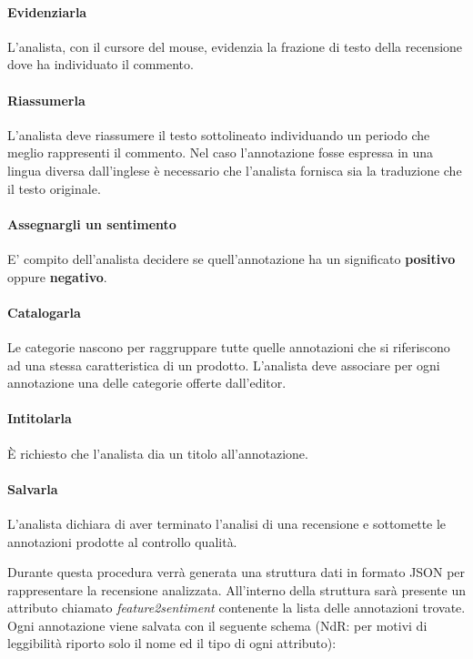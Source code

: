 \paragraph{Evidenziarla}
\label{evidenziarla}
L'analista, con il cursore del mouse, evidenzia la frazione di testo della
recensione dove ha individuato il commento.

\paragraph{Riassumerla}
\label{riassumerla}
L'analista deve riassumere il testo sottolineato individuando un periodo che
meglio rappresenti il commento. Nel caso l'annotazione fosse espressa in una
lingua diversa dall'inglese è necessario che l'analista fornisca sia la
traduzione che il testo originale.

\paragraph{Assegnargli un sentimento}
\label{sentimento}
E' compito dell'analista decidere se quell'annotazione ha un significato
\textbf{positivo} oppure \textbf{negativo}.

\paragraph{Catalogarla}
\label{catalogarla}
Le categorie nascono per raggruppare tutte quelle annotazioni che si
riferiscono ad una stessa caratteristica di un prodotto. L'analista deve
associare per ogni annotazione una delle categorie offerte dall'editor.

\paragraph{Intitolarla}
\label{intitolarla}
È richiesto che l'analista dia un titolo all'annotazione.

\paragraph{Salvarla}
\label{salvarla}
L'analista dichiara di aver terminato l'analisi di una recensione e sottomette
le annotazioni prodotte al controllo qualità.

Durante questa procedura verrà generata una struttura dati in formato \gls{JSON}
per rappresentare la recensione analizzata. All'interno della struttura sarà 
presente un attributo chiamato \textit{feature2sentiment} contenente la lista 
delle annotazioni trovate. Ogni annotazione viene salvata con il seguente schema
(NdR: per motivi di leggibilità riporto solo il nome ed il tipo di ogni 
attributo):

